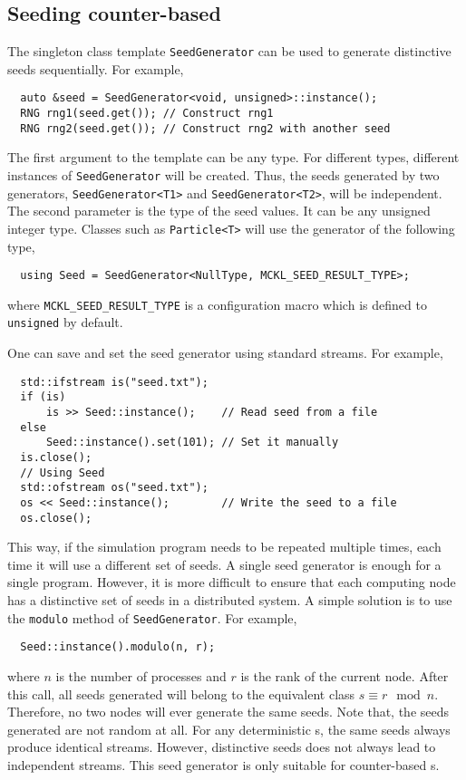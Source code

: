 \subsection{Seeding counter-based \texorpdfstring{\protect\rng}{RNG}}
\label{sub:Seeding counter-based RNG}

The singleton class template \verb|SeedGenerator| can be used to generate
distinctive seeds sequentially. For example,
\begin{Verbatim}
  auto &seed = SeedGenerator<void, unsigned>::instance();
  RNG rng1(seed.get()); // Construct rng1
  RNG rng2(seed.get()); // Construct rng2 with another seed
\end{Verbatim}
The first argument to the template can be any type. For different types,
different instances of \verb|SeedGenerator| will be created. Thus, the seeds
generated by two generators, \verb|SeedGenerator<T1>| and
\verb|SeedGenerator<T2>|, will be independent. The second parameter is the type
of the seed values. It can be any unsigned integer type. Classes such as
\verb|Particle<T>| will use the generator of the following type,
\begin{Verbatim}
  using Seed = SeedGenerator<NullType, MCKL_SEED_RESULT_TYPE>;
\end{Verbatim}
where \verb|MCKL_SEED_RESULT_TYPE| is a configuration macro which is defined to
\verb|unsigned| by default.

One can save and set the seed generator using standard streams. For example,
\begin{Verbatim}
  std::ifstream is("seed.txt");
  if (is)
      is >> Seed::instance();    // Read seed from a file
  else
      Seed::instance().set(101); // Set it manually
  is.close();
  // Using Seed
  std::ofstream os("seed.txt");
  os << Seed::instance();        // Write the seed to a file
  os.close();
\end{Verbatim}
This way, if the simulation program needs to be repeated multiple times, each
time it will use a different set of seeds. A single seed generator is enough
for a single program. However, it is more difficult to ensure that each
computing node has a distinctive set of seeds in a distributed system. A simple
solution is to use the \verb|modulo| method of \verb|SeedGenerator|. For
example,
\begin{Verbatim}
  Seed::instance().modulo(n, r);
\end{Verbatim}
where $n$ is the number of processes and $r$ is the rank of the current node.
After this call, all seeds generated will belong to the equivalent class $s
\equiv r \mod n$. Therefore, no two nodes will ever generate the same seeds.
Note that, the seeds generated are not random at all. For any deterministic
\rng{}s, the same seeds always produce identical streams. However, distinctive
seeds does not always lead to independent streams. This seed generator is only
suitable for counter-based \rng{}s.

